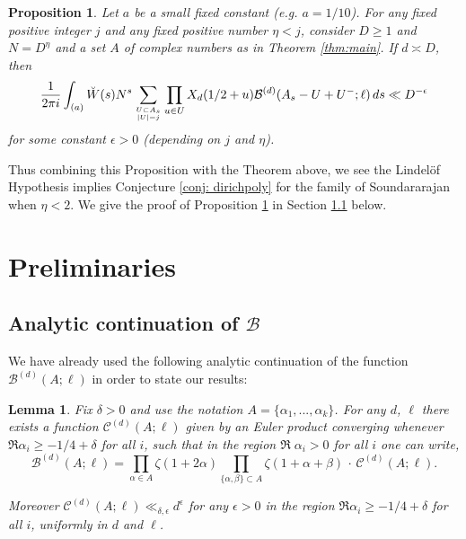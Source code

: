 \documentclass[12pt]{amsart}
\newtheorem{lemma}{Lemma}
\newtheorem{prop}{Proposition}
\begin{document}
	\begin{prop}
		\label{prop:swap_dropping}
		Let $a$ be a small fixed constant (e.g. $a = 1/10$). For any fixed positive integer $j$ and any fixed positive number $\eta < j$, consider $D \geq 1$ and $N = D^\eta$ and a set $A$ of complex numbers as in Theorem \ref{thm:main}. If $d \asymp D$, then
		\begin{equation}
			\label{eq:swap_drop}
			\frac{1}{2\pi i} \int_{(a)} \breve{W}(s) N^s \sum_{U \subset A_s \atop |U| = j} \prod_{u\in U} X_d(1/2+u) \mathcal{B}^{(d)}(A_s - U + U^{-};\ell)\,ds \ll D^{-\epsilon}
		\end{equation}
		for some constant $\epsilon > 0$ (depending on $j$ and $\eta$).
	\end{prop}
	
	Thus combining this Proposition with the Theorem above, we see the Lindel\"of Hypothesis implies Conjecture \ref{conj: dirichpoly} for the family of Soundararajan when $\eta < 2$. We give the proof of Proposition \ref{prop:swap_dropping} in Section \ref{subsec:B_cont} below.
	
	\section{Preliminaries} 
	\label{sec:prelim}
	
	\subsection{Analytic continuation of $\mathcal{B}$}
	\label{subsec:B_cont}
	
	We have already used the following analytic continuation of the function $\mathcal{B}^{(d)}(A;\ell)$ in order to state our results:
	
	\begin{lemma}
		\label{lem:B_cont}
		Fix $\delta > 0$ and use the notation $A = \{\alpha_1,...,\alpha_k\}$. For any $d$, $\ell$ there exists a function $\mathcal{C}^{(d)}(A;\ell)$ given by an Euler product converging whenever $\Re \alpha_i \geq -1/4+\delta$ for all $i$, such that in the region $\Re\; \alpha_i > 0$ for all $i$ one can write,
		$$
		\mathcal{B}^{(d)}(A;\ell) = \prod_{\alpha \in A} \zeta(1+2\alpha) \prod_{\{\alpha,\beta\} \subset A} \zeta(1+\alpha+\beta)\, \cdot \, \mathcal{C}^{(d)}(A;\ell).
		$$
		
		Moreover $\mathcal{C}^{(d)}(A;\ell) \ll_{\delta,\epsilon} d^\epsilon$ for any $\epsilon > 0$ in the region $\Re \alpha_i \geq -1/4+\delta$ for all $i$, uniformly in $d$ and $\ell$.
	\end{lemma}
	
\end{document}
